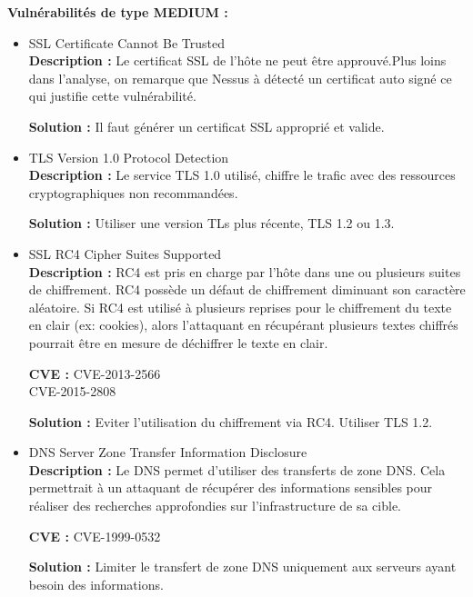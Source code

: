 \documentclass[french,paper=a4,oneside,captions=tableheading]{article}
\begin{document}
\textbf{Vulnérabilités de type MEDIUM :}
\begin{itemize}
    \item SSL Certificate Cannot Be Trusted\\
\textbf{Description :}
Le certificat SSL de l'hôte ne peut être approuvé.Plus loins dans l'analyse, on remarque que Nessus à détecté un certificat auto signé ce qui justifie cette vulnérabilité.

\textbf{Solution :}
Il faut générer un certificat SSL approprié et valide.\\

\item TLS Version 1.0 Protocol Detection\\
\textbf{Description :}
Le service TLS 1.0 utilisé, chiffre le trafic avec des ressources cryptographiques non recommandées.

\textbf{Solution :}
Utiliser une version TLs plus récente, TLS 1.2 ou 1.3.\\

\item SSL RC4 Cipher Suites Supported\\
\textbf{Description :}
RC4 est pris en charge par l'hôte dans une ou plusieurs suites de chiffrement. RC4 possède un défaut de chiffrement diminuant son caractère aléatoire. Si RC4 est utilisé à plusieurs reprises pour le chiffrement du texte en clair (ex: cookies), alors l'attaquant en récupérant plusieurs textes chiffrés pourrait être en mesure de déchiffrer le texte en clair.

\textbf{CVE :}
CVE-2013-2566\\
CVE-2015-2808

\textbf{Solution :}
Eviter l'utilisation du chiffrement via RC4. Utiliser TLS 1.2.\\

\item DNS Server Zone Transfer Information Disclosure\\
\textbf{Description :}
Le DNS permet d'utiliser des transferts de zone DNS. Cela permettrait à un attaquant de récupérer des informations sensibles pour réaliser des recherches approfondies sur l'infrastructure de sa cible.

\textbf{CVE :}
CVE-1999-0532

\textbf{Solution :}
Limiter le transfert de zone DNS uniquement aux serveurs ayant besoin des informations.\\
\end{itemize}
\end{document}
